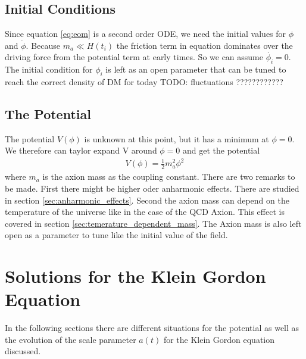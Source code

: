 \documentclass[a4paper]{article}
\begin{document}
\subsection{Initial Conditions}
Since equation \ref{eq:eom} is a second order ODE, we need the initial values
for $\phi$ and $\dot{\phi}$.
Because $m_a \ll H(t_i)$ the friction term in equation dominates over the
driving force from the potential term at early times.
So we can assume $\dot{\phi_i} = 0$.
The initial condition for $\phi_i$ is left as an open parameter that can be tuned to
reach the correct density of DM for today \cite[Chap. 4.2, Page 26]{MarshAxionCosmo}
TODO: fluctuations ????????????

\subsection{The Potential}
The potential $V(\phi)$ is unknown at this point, but it has a minimum
at $\phi = 0$. We therefore can taylor expand V around $\phi = 0$
and get the potential
\begin{align}
    \label{eq:potential}
    V(\phi) = \frac{1}{2} m_a^2 \phi^2
\end{align}
where $m_a$ is the axion mass as the coupling constant.
There are two remarks to be made.
First there might be higher oder anharmonic effects.
There are studied in section \ref{sec:anharmonic_effects}.
Second the axion mass can depend on the temperature of
the universe like in the case of the QCD Axion.
This effect is covered in section \ref{sec:temerature_dependent_mass}.
The Axion mass is also left open as a parameter to tune like
the initial value of the field.

\section{Solutions for the Klein Gordon Equation}
In the following sections there are different
situations for the potential as well as the
evolution of the scale parameter $a(t)$ for the
Klein Gordon equation discussed.
\end{document}
